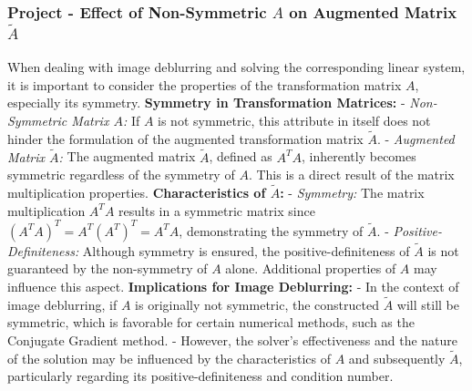 \documentclass[unicode,11pt,a4paper,oneside,numbers=endperiod,openany]{scrartcl}
\begin{document}
\subsubsection{Project - Effect of Non-Symmetric \( A \) on Augmented Matrix \( \tilde{A} \)}
When dealing with image deblurring and solving the corresponding linear system, it is important to consider the properties of the transformation matrix \( A \), especially its symmetry.
\newline
\textbf{Symmetry in Transformation Matrices:}
- \textit{Non-Symmetric Matrix \( A \):} If \( A \) is not symmetric, this attribute in itself does not hinder the formulation of the augmented transformation matrix \( \tilde{A} \).
- \textit{Augmented Matrix \( \tilde{A} \):} The augmented matrix \( \tilde{A} \), defined as \( A^TA \), inherently becomes symmetric regardless of the symmetry of \( A \). This is a direct result of the matrix multiplication properties.
\newline
\textbf{Characteristics of \( \tilde{A} \):}
- \textit{Symmetry:} The matrix multiplication \( A^TA \) results in a symmetric matrix since \( (A^TA)^T = A^T(A^T)^T = A^TA \), demonstrating the symmetry of \( \tilde{A} \).
- \textit{Positive-Definiteness:} Although symmetry is ensured, the positive-definiteness of \( \tilde{A} \) is not guaranteed by the non-symmetry of \( A \) alone. Additional properties of \( A \) may influence this aspect.
\newline
\textbf{Implications for Image Deblurring:}
- In the context of image deblurring, if \( A \) is originally not symmetric, the constructed \( \tilde{A} \) will still be symmetric, which is favorable for certain numerical methods, such as the Conjugate Gradient method.
- However, the solver's effectiveness and the nature of the solution may be influenced by the characteristics of \( A \) and subsequently \( \tilde{A} \), particularly regarding its positive-definiteness and condition number.
\end{document}
